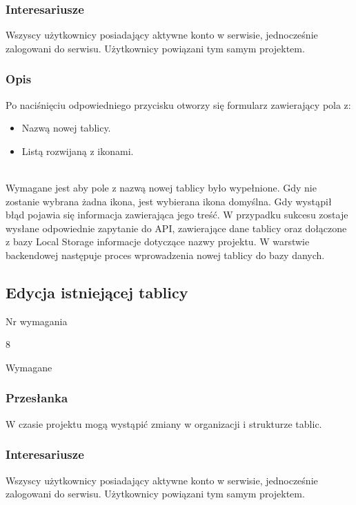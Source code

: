 \documentclass[eng,printmode]{mgr}
\begin{document}
\subsubsection{Interesariusze}
Wszyscy użytkownicy posiadający aktywne konto w serwisie, jednocześnie zalogowani do serwisu. Użytkownicy powiązani tym samym projektem.

\subsubsection{Opis}
Po naciśnięciu odpowiedniego przycisku otworzy się formularz zawierający pola z:
\begin{itemize}
  \item[--] Nazwą nowej tablicy.
  \item[--] Listą rozwijaną z ikonami.
\end{itemize}
\ \\
Wymagane jest aby pole z nazwą nowej tablicy było wypełnione. Gdy nie zostanie wybrana żadna ikona, jest wybierana ikona domyślna. Gdy wystąpił błąd pojawia się informacja zawierająca jego treść. W przypadku sukcesu zostaje wysłane odpowiednie zapytanie do API, zawierające dane tablicy oraz dołączone z bazy Local Storage informacje dotyczące nazwy projektu. W warstwie backendowej następuje proces wprowadzenia nowej tablicy do bazy danych.
\newpage

\subsection{Edycja istniejącej tablicy}
\begin{labeling}{Nr wymagania}
\item [Nr wymagania:] 8
\item [Priorytet:] Wymagane
\end{labeling}

\subsubsection{Przesłanka}
W czasie projektu mogą wystąpić zmiany w organizacji i strukturze tablic. 

\subsubsection{Interesariusze}
Wszyscy użytkownicy posiadający aktywne konto w serwisie, jednocześnie zalogowani do serwisu. Użytkownicy powiązani tym samym projektem.
\end{document}
